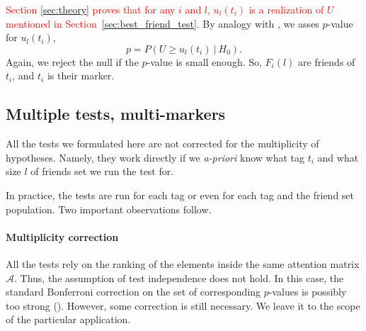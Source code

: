 \documentclass{llncs}
\begin{document}

 







\textcolor{red}{Section \ref{sec:theory} proves that for any $i$ and $l$, $u_l(t_i)$ is a realization of $U$ mentioned in Section~\ref{sec:best_friend_test}.}
By analogy with , we asses $p$-value for $u_{l}(t_i)$,
\[
p = P\left(U \ge u_l(t_i)~|~H_0\right). 
\]
Again, we reject the null if the $p$-value is small enough. So, $F_{i}(l)$ are friends of $t_i$, and $t_i$ is their marker.


\subsection{Multiple tests, multi-markers}
\label{sec:multimurkers}

All the tests we formulated here are not corrected for the multiplicity of hypotheses. Namely, they work directly if we \textit{a-priori} know what tag $t_i$ and what size $l$ of friends set we run the test for. 

In practice, the tests are run for each tag or even for each tag and the friend set population. Two important observations follow.

\paragraph*{Multiplicity correction} All the tests rely on the ranking of the elements inside the same attention matrix $\mathcal{A}$. Thus, the assumption of test independence does not hold. In this case, the standard Bonferroni correction on the set of corresponding $p$-values is possibly too strong (\cite{cabin2000bonferroni}). However, some correction is still necessary. We leave it to the scope of the particular application.
\end{document}
